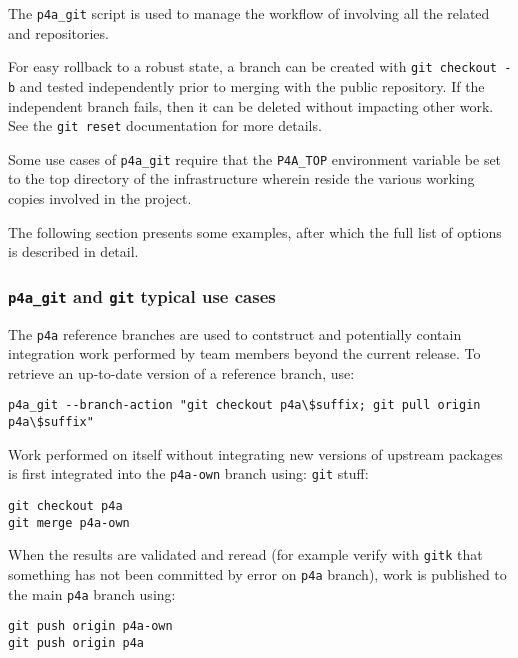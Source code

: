 \documentclass[a4paper]{article}
\begin{document}
The \verb|p4a_git| script is used to manage the workflow of \Apfa
involving all the related \Agit and \Asvn repositories.

For easy rollback to a robust state, a branch can be created with
\texttt{git checkout -b} and tested independently prior to merging
with the public repository. If the independent branch fails, then it
can be deleted without impacting other work.
See the \texttt{git reset} documentation for more details.

Some use cases of \verb|p4a_git| require that the \verb|P4A_TOP|
environment variable be set to the top directory of the \Apfa
infrastructure wherein reside the various \Agit working copies involved in the
project.

The following section presents some examples, after which the full
list of options is described in detail.

\subsubsection{\protect\texttt{p4a\_git} and \protect\texttt{git} typical use cases}
\label{sec:p4a_git-typical-use}

The \Apfa \texttt{p4a} reference branches are used to contstruct \Apfa
and potentially contain integration work performed by \Apfa team
members beyond the current release. To retrieve an up-to-date version
of a reference branch, use:
\begin{verbatim}
p4a_git --branch-action "git checkout p4a\$suffix; git pull origin p4a\$suffix"
\end{verbatim}

Work performed on \Apfa itself without integrating new versions of upstream
packages is first integrated into the \texttt{p4a-own} branch using:
\texttt{git} stuff:
\begin{verbatim}
git checkout p4a
git merge p4a-own
\end{verbatim}
When the results are validated and reread (for example verify with
\texttt{gitk} that something has not been committed by error on
\texttt{p4a} branch), work is published to the main \texttt{p4a} branch
using:
\begin{verbatim}
git push origin p4a-own
git push origin p4a
\end{verbatim}
\end{document}
